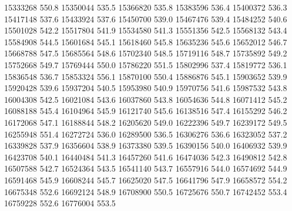 15333268 550.8
15350044 535.5
15366820 535.8
15383596 536.4
15400372 536.3
15417148 537.6
15433924 537.6
15450700 539.0
15467476 539.4
15484252 540.6
15501028 542.2
15517804 541.9
15534580 541.3
15551356 542.5
15568132 543.4
15584908 544.5
15601684 545.1
15618460 545.8
15635236 545.6
15652012 546.7
15668788 547.5
15685564 548.6
15702340 548.5
15719116 548.7
15735892 549.2
15752668 549.7
15769444 550.0
15786220 551.5
15802996 537.4
15819772 536.1
15836548 536.7
15853324 556.1
15870100 550.4
15886876 545.1
15903652 539.9
15920428 539.6
15937204 540.5
15953980 540.9
15970756 541.6
15987532 543.8
16004308 542.5
16021084 543.6
16037860 543.8
16054636 544.8
16071412 545.2
16088188 545.4
16104964 545.9
16121740 545.6
16138516 547.4
16155292 546.2
16172068 547.1
16188844 548.2
16205620 549.0
16222396 549.7
16239172 549.5
16255948 551.4
16272724 536.0
16289500 536.5
16306276 536.6
16323052 537.2
16339828 537.9
16356604 538.9
16373380 539.5
16390156 540.0
16406932 539.9
16423708 540.1
16440484 541.3
16457260 541.6
16474036 542.3
16490812 542.8
16507588 542.7
16524364 543.5
16541140 543.7
16557916 544.0
16574692 544.9
16591468 545.9
16608244 545.7
16625020 547.5
16641796 547.9
16658572 554.2
16675348 552.6
16692124 548.9
16708900 550.5
16725676 550.7
16742452 553.4
16759228 552.6
16776004 553.5
